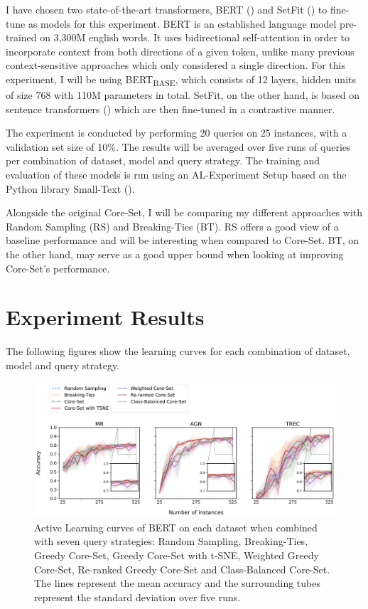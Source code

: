 \documentclass[english,bachelor,ul]{webisthesis} %
\begin{document}
I have chosen two state-of-the-art transformers, BERT (\cite{DBLP:conf/naacl/DevlinCLT19}) and SetFit (\cite{DBLP:setfit}) to fine-tune as models for this experiment. BERT is an established language model pre-trained on 3,300M english words. It uses bidirectional self-attention in order to incorporate context from both directions of a given token, unlike many previous context-sensitive approaches which only considered a single direction. For this experiment, I will be using BERT\textsubscript{BASE}, which consists of 12 layers, hidden units of size 768 with 110M parameters in total. SetFit, on the other hand, is based on sentence transformers (\cite{DBLP:conf/emnlp/ReimersG19}) which are then fine-tuned in a contrastive manner.

The experiment is conducted by performing 20 queries on 25 instances, with a validation set size of 10\%. The results will be averaged over five runs of queries per combination of dataset, model and query strategy. The training and evaluation of these models is run using an AL-Experiment Setup based on the Python library Small-Text (\cite{schroeder2023small-text}).

Alongside the original Core-Set, I will be comparing my different approaches with Random Sampling (RS) and Breaking-Ties (BT). RS offers a good view of a baseline performance and will be interesting when compared to Core-Set. BT, on the other hand, may serve as a good upper bound when looking at improving Core-Set's performance. 


\section{Experiment Results}

The following figures show the learning curves for each combination of dataset, model and query strategy. 

\begin{figure}[htbp]
    \centering
    \includegraphics[width=1\textwidth]{img/bert-plots-1.png}
    \caption{Active Learning curves of BERT on each dataset when combined with seven query strategies: Random Sampling, Breaking-Ties, Greedy Core-Set, Greedy Core-Set with t-SNE, Weighted Greedy Core-Set, Re-ranked Greedy Core-Set and Class-Balanced Core-Set. The lines represent the mean accuracy and the surrounding tubes represent the standard deviation over five runs.}
    \label{fig:bert-curves}
\end{figure}
\end{document}
